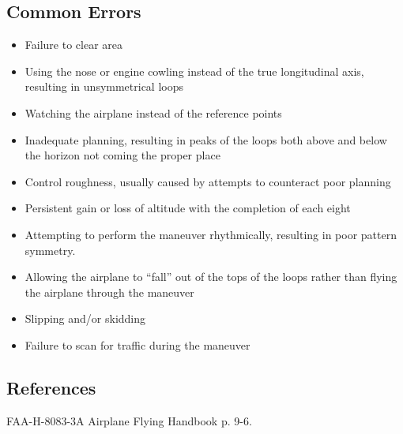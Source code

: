 \subsection{Common Errors}

\begin{itemize}

  \item Failure to clear area
  \item Using the nose or engine cowling instead of the true longitudinal axis,
    resulting in unsymmetrical loops
  \item Watching the airplane instead of the reference points
  \item Inadequate planning, resulting in peaks of the loops both above and
    below the horizon not coming the proper place
  \item Control roughness, usually caused by attempts to counteract poor
    planning
  \item Persistent gain or loss of altitude with the completion of each eight
  \item Attempting to perform the maneuver rhythmically, resulting in poor
    pattern symmetry.
  \item Allowing the airplane to ``fall'' out of the tops of the loops rather
    than flying the airplane through the maneuver
  \item Slipping and/or skidding
  \item Failure to scan for traffic during the maneuver

\end{itemize}

\subsection{References}

FAA-H-8083-3A Airplane Flying Handbook p. 9-6.


